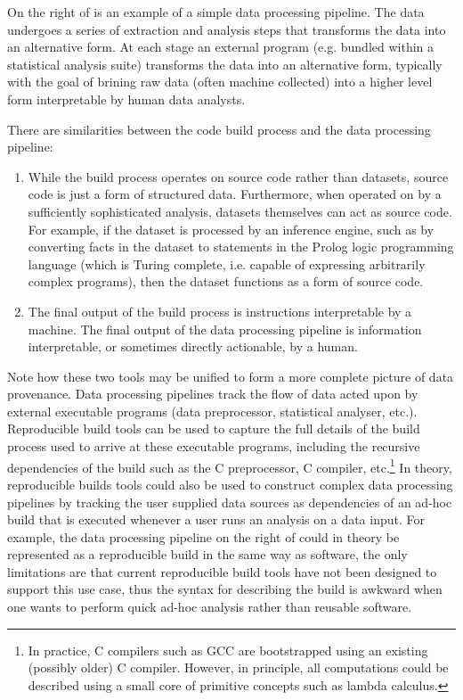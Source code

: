 On the right of  is an example of a simple data processing pipeline. The data undergoes a series of extraction and analysis steps that transforms the data into an alternative form. At each stage an external program (e.g. bundled within a statistical analysis suite) transforms the data into an alternative form, typically with the goal of brining raw data (often machine collected) into a higher level form interpretable by human data analysts.

There are similarities between the code build process and the data processing pipeline:
\begin{enumerate}
  \item While the build process operates on source code rather than datasets, source code is just a form of structured data. Furthermore, when operated on by a sufficiently sophisticated analysis, datasets themselves can act as source code. For example, if the dataset is processed by an inference engine, such as by converting facts in the dataset to statements in the Prolog logic programming language (which is Turing complete, i.e. capable of expressing arbitrarily complex programs), then the dataset functions as a form of source code.
  \item The final output of the build process is instructions interpretable by a machine. The final output of the data processing pipeline is information interpretable, or sometimes directly actionable, by a human.
\end{enumerate}

Note how these two tools may be unified to form a more complete picture of data provenance. Data processing pipelines track the flow of data acted upon by external executable programs (data preprocessor, statistical analyser, etc.). Reproducible build tools can be used to capture the full details of the build process used to arrive at these executable programs, including the recursive dependencies of the build such as the C preprocessor, C compiler, etc.\footnote{In practice, C compilers such as GCC are bootstrapped using an existing (possibly older) C compiler. However, in principle, all computations could be described using a small core of primitive concepts such as lambda calculus.} In theory, reproducible builds tools could also be used to construct complex data processing pipelines by tracking the user supplied data sources as dependencies of an ad-hoc build that is executed whenever a user runs an analysis on a data input. For example, the data processing pipeline on the right of  could in theory be represented as a reproducible build in the same way as software, the only limitations are that current reproducible build tools have not been designed to support this use case, thus the syntax for describing the build is awkward when one wants to perform quick ad-hoc analysis rather than reusable software.

